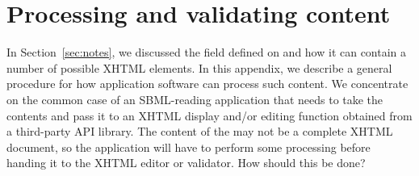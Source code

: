 
\section{Processing and validating  content}
\label{apdx:processing-notes}

In Section~\ref{sec:notes}, we discussed the  field
defined on \SBase and how it can contain a number of possible
XHTML elements.  In this appendix, we describe a general procedure
for how application software can process such content.  We
concentrate on the common case of an SBML-reading application that
needs to take the contents and pass it to an XHTML display and/or
editing function obtained from a third-party API library.  The
content of the  may not be a complete XHTML document,
so the application will have to perform some processing before
handing it to the XHTML editor or validator.  How should this be
done?

